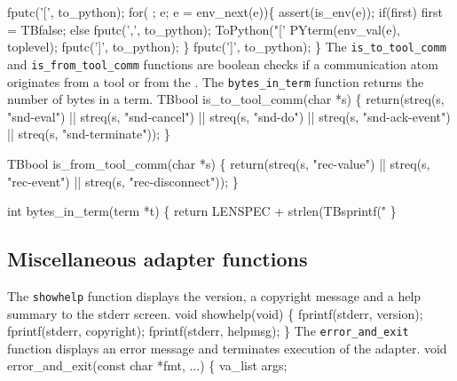   fputc('[', to_python);
  for( ; e; e = env_next(e))\{
    assert(is_env(e));    
    if(first) first = TBfalse;
    else      fputc(',', to_python);
    ToPython("['%
    PYterm(env_val(e), toplevel);
    fputc(']', to_python);
  \}
  fputc(']', to_python);
\}
\nwendcode{}\nwdocspar
The \texttt{is\_to\_tool\_comm} and \texttt{is\_from\_tool\_comm}
functions are boolean checks if a communication atom originates from a
tool or from the \TB. The \texttt{bytes\_in\_term} function returns
the number of bytes in a term. 
\nwenddocs{}\plusendmoddef\nwstartdeflinemarkup{}\nwenddeflinemarkup
TBbool is_to_tool_comm(char *s) \{
  return(streq(s, "snd-eval") || streq(s, "snd-cancel") || 
         streq(s, "snd-do")   || streq(s, "snd-ack-event") ||
         streq(s, "snd-terminate"));
\}

TBbool is_from_tool_comm(char *s) \{
  return(streq(s, "rec-value") || streq(s, "rec-event") || 
         streq(s, "rec-disconnect"));
\}

int bytes_in_term(term *t) \{
  return LENSPEC + strlen(TBsprintf("%
\}
\nwendcode{}\nwdocspar


\subsection{Miscellaneous adapter functions}


The \texttt{showhelp} function displays the version, a copyright
message and a help summary to the stderr screen.
\nwenddocs{}\endmoddef\nwstartdeflinemarkup{}\nwenddeflinemarkup
void showhelp(void) \{
  fprintf(stderr, version);
  fprintf(stderr, copyright);
  fprintf(stderr, helpmsg);
\}
\nwendcode{}\nwdocspar
The \texttt{error\_and\_exit} function displays an error message and
terminates execution of the adapter.
\nwenddocs{}\plusendmoddef\nwstartdeflinemarkup{}\nwenddeflinemarkup
void error_and_exit(const char *fmt, ...) \{
  va_list args;

